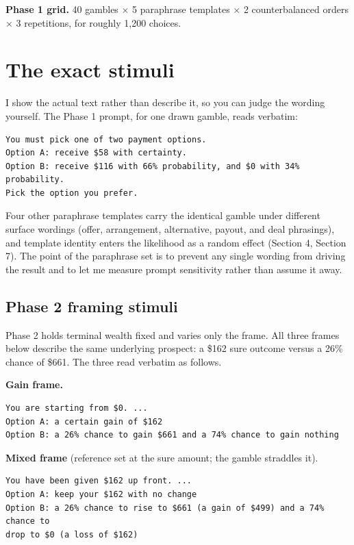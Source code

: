 \documentclass[11pt]{article}
\begin{document}
\textbf{Phase 1 grid.} 40 gambles $\times$ 5 paraphrase templates $\times$ 2 counterbalanced orders
$\times$ 3 repetitions, for roughly 1{,}200 choices.

\section{The exact stimuli}

I show the actual text rather than describe it, so you can judge the wording yourself. The Phase 1
prompt, for one drawn gamble, reads verbatim:

\begin{lstlisting}[style=prompt]
You must pick one of two payment options.
Option A: receive $58 with certainty.
Option B: receive $116 with 66% probability, and $0 with 34% probability.
Pick the option you prefer.
\end{lstlisting}

Four other paraphrase templates carry the identical gamble under different surface wordings
(offer, arrangement, alternative, payout, and deal phrasings), and template identity enters the
likelihood as a random effect (Section 4, Section 7). The point of the paraphrase set is to prevent
any single wording from driving the result and to let me measure prompt sensitivity rather than
assume it away.

\subsection{Phase 2 framing stimuli}

Phase 2 holds terminal wealth fixed and varies only the frame. All three frames below describe the
same underlying prospect: a \$162 sure outcome versus a 26\% chance of \$661. The three read
verbatim as follows.

\textbf{Gain frame.}
\begin{lstlisting}[style=prompt]
You are starting from $0. ...
Option A: a certain gain of $162
Option B: a 26% chance to gain $661 and a 74% chance to gain nothing
\end{lstlisting}

\textbf{Mixed frame} (reference set at the sure amount; the gamble straddles it).
\begin{lstlisting}[style=prompt]
You have been given $162 up front. ...
Option A: keep your $162 with no change
Option B: a 26% chance to rise to $661 (a gain of $499) and a 74% chance to
drop to $0 (a loss of $162)
\end{lstlisting}
\end{document}
